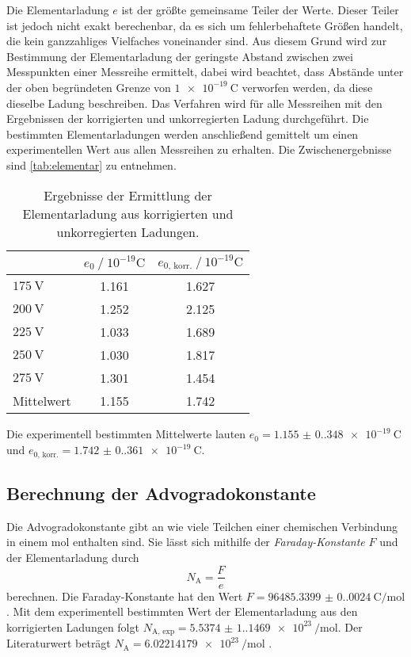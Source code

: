 Die Elementarladung $e$ ist der größte gemeinsame Teiler der Werte. Dieser Teiler ist jedoch nicht exakt berechenbar, da es sich um fehlerbehaftete Größen handelt, die
kein ganzzahliges Vielfaches voneinander sind. Aus diesem Grund wird zur Bestimmung der Elementarladung der geringste Abstand zwischen zwei Messpunkten 
einer Messreihe ermittelt, dabei wird beachtet, dass Abstände unter der oben begründeten Grenze von $\qty{1e-19}{\coulomb}$ verworfen werden, da diese
dieselbe Ladung beschreiben.
Das Verfahren wird für alle Messreihen mit den Ergebnissen der korrigierten und unkorregierten Ladung durchgeführt. Die bestimmten Elementarladungen werden anschließend
gemittelt um einen experimentellen Wert aus allen Messreihen zu erhalten. Die Zwischenergebnisse sind \autoref{tab:elementar} zu entnehmen.

\begin{table}
    \centering
    \caption{Ergebnisse der Ermittlung der Elementarladung aus korrigierten und unkorregierten Ladungen.}
    \label{tab:elementar}
    \begin{tabular}{l S[table-format = 1.3] S}
      \toprule
        {} & {$e_0 \mathbin{/} 10^{-19} \unit{\coulomb}$} & {$e_{0\text{, korr.}} \mathbin{/} 10^{-19} \unit{\coulomb}$} \\
        \midrule
        {$\qty{175}{\volt}$} & 1.161 & 1.627 \\
        {$\qty{200}{\volt}$} & 1.252 & 2.125 \\
        {$\qty{225}{\volt}$} & 1.033 & 1.689 \\
        {$\qty{250}{\volt}$} & 1.030 & 1.817 \\
        {$\qty{275}{\volt}$} & 1.301 & 1.454 \\
        {Mittelwert}         & 1.155 & 1.742 \\
      \bottomrule
    \end{tabular}
  \end{table}
Die experimentell bestimmten Mittelwerte lauten $e_0 = \qty{1.155(0.348)e-19}{\coulomb}$ und $e_{0 \text{, korr.}} = \qty{1.742(0.361)e-19}{\coulomb}$. 
\subsection{Berechnung der Advogradokonstante}
\label{subsec:Avogadro}
Die Advogradokonstante gibt an wie viele Teilchen einer chemischen Verbindung in einem $\unit{\mol}$ enthalten sind.
Sie lässt sich mithilfe der \textit{Faraday-Konstante} $F$ und der Elementarladung durch
\begin{equation*}
    \label{eqn:N_A}
    N_\text{A} = \frac{F}{e}
\end{equation*}
berechnen. Die Faraday-Konstante hat den Wert $F = \qty{96485.3399(0.0024)}{\coulomb\per\mol}$ \cite{Ingenieurwissen}.
Mit dem experimentell bestimmten Wert der Elementarladung aus den korrigierten Ladungen folgt $N_\text{A, exp} = \qty{5.5374(1.1469)e23}{\per\mol}$.
Der Literaturwert beträgt $N_\text{A} = \qty{6.02214179e23}{\per\mol}$ \cite{Ingenieurwissen}.
